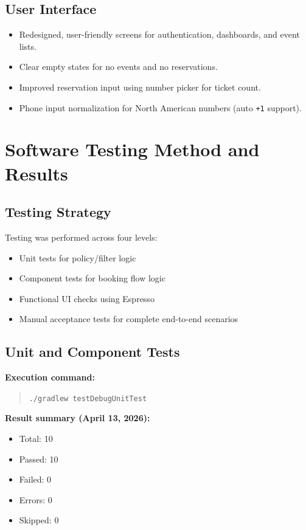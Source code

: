 \documentclass[12pt,a4paper]{article}
\begin{document}
\subsection{User Interface}

\begin{itemize}
    \item Redesigned, user-friendly screens for authentication, dashboards, and event lists.
    \item Clear empty states for no events and no reservations.
    \item Improved reservation input using number picker for ticket count.
    \item Phone input normalization for North American numbers (auto \texttt{+1} support).
\end{itemize}

\section{Software Testing Method and Results}

\subsection{Testing Strategy}

Testing was performed across four levels:
\begin{itemize}
    \item Unit tests for policy/filter logic
    \item Component tests for booking flow logic
    \item Functional UI checks using Espresso
    \item Manual acceptance tests for complete end-to-end scenarios
\end{itemize}

\subsection{Unit and Component Tests}

\textbf{Execution command:}
\begin{quote}
\texttt{./gradlew testDebugUnitTest}
\end{quote}

\textbf{Result summary (April 13, 2026):}
\begin{itemize}
    \item Total: 10
    \item Passed: 10
    \item Failed: 0
    \item Errors: 0
    \item Skipped: 0
\end{itemize}
\end{document}
